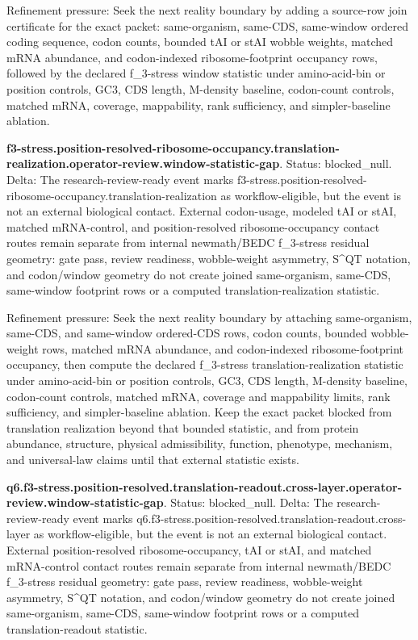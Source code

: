 Refinement pressure: Seek the next reality boundary by adding a source-row join certificate for the exact packet: same-organism, same-CDS, same-window ordered coding sequence, codon counts, bounded tAI or stAI wobble weights, matched mRNA abundance, and codon-indexed ribosome-footprint occupancy rows, followed by the declared f\_3-stress window statistic under amino-acid-bin or position controls, GC3, CDS length, M-density baseline, codon-count controls, matched mRNA, coverage, mappability, rank sufficiency, and simpler-baseline ablation.

\textbf{f3-stress.position-resolved-ribosome-occupancy.translation-realization.operator-review.window-statistic-gap}. Status: blocked\_null. Delta: The research-review-ready event marks f3-stress.position-resolved-ribosome-occupancy.translation-realization as workflow-eligible, but the event is not an external biological contact. External codon-usage, modeled tAI or stAI, matched mRNA-control, and position-resolved ribosome-occupancy contact routes remain separate from internal newmath/BEDC f\_3-stress residual geometry: gate pass, review readiness, wobble-weight asymmetry, S\textasciicircum{}QT notation, and codon/window geometry do not create joined same-organism, same-CDS, same-window footprint rows or a computed translation-realization statistic.

Refinement pressure: Seek the next reality boundary by attaching same-organism, same-CDS, and same-window ordered-CDS rows, codon counts, bounded wobble-weight rows, matched mRNA abundance, and codon-indexed ribosome-footprint occupancy, then compute the declared f\_3-stress translation-realization statistic under amino-acid-bin or position controls, GC3, CDS length, M-density baseline, codon-count controls, matched mRNA, coverage and mappability limits, rank sufficiency, and simpler-baseline ablation. Keep the exact packet blocked from translation realization beyond that bounded statistic, and from protein abundance, structure, physical admissibility, function, phenotype, mechanism, and universal-law claims until that external statistic exists.

\textbf{q6.f3-stress.position-resolved.translation-readout.cross-layer.operator-review.window-statistic-gap}. Status: blocked\_null. Delta: The research-review-ready event marks q6.f3-stress.position-resolved.translation-readout.cross-layer as workflow-eligible, but the event is not an external biological contact. External position-resolved ribosome-occupancy, tAI or stAI, and matched mRNA-control contact routes remain separate from internal newmath/BEDC f\_3-stress residual geometry: gate pass, review readiness, wobble-weight asymmetry, S\textasciicircum{}QT notation, and codon/window geometry do not create joined same-organism, same-CDS, same-window footprint rows or a computed translation-readout statistic.

